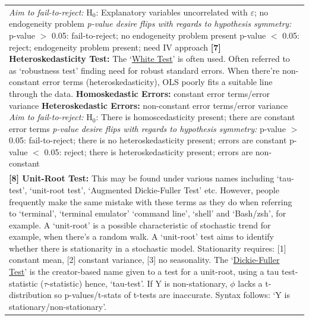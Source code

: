 \documentclass[11pt, english]{article}
\begin{document}
\begin{center}
\begin{longtable}{p{14cm}}
			\textit{Aim to fail-to-reject:}\newline
			H$_0$: Explanatory variables uncorrelated with $\varepsilon$; no endogeneity problem\newline\newline
			\textit{p-value desire flips with regards to hypothesis symmetry:}\newline
			p-value $>$ 0.05: fail-to-reject; no endogeneity problem present\newline
			p-value $<$ 0.05: reject; endogeneity problem present; need IV approach\newline\newline
			\textbf{[7] Heteroskedasticity Test: }The `\underline{White Test}' is often used. Often referred to as `robustness test' finding need for robust standard errors. When there’re non-constant error terms (heteroskedasticity), OLS poorly fits a suitable line through the data.\newline\newline
			\textbf{Homoskedastic Errors: }constant error terms/error variance\newline
			\textbf{Heteroskedastic Errors: }non-constant error terms/error variance\newline\newline
			\textit{Aim to fail-to-reject:}\newline
			H$_0$: There is homoscedasticity present; there are constant error terms\newline\newline
			\textit{p-value desire flips with regards to hypothesis symmetry:}\newline
			p-value $>$ 0.05: fail-to-reject; there is no heteroskedasticity present; errors are constant\newline
			p-value $<$ 0.05: reject; there is heteroskedasticity present; errors are non-constant\\
			\textbf{[8] Unit-Root Test: }This may be found under various names including `tau-test’, `unit-root test’, `Augmented Dickie-Fuller Test’ etc. However, people frequently make the same mistake with these terms as they do when referring to `terminal’, `terminal emulator’ `command line’, `shell’ and `Bash/zsh’, for example.\newline\newline
			A `unit-root’ is a possible characteristic of stochastic trend for example, when there’s a random walk. A `unit-root’ test aims to identify whether there is stationarity in a stochastic model. Stationarity requires: [1] constant mean, [2] constant variance, [3] no seasonality. The `\underline{Dickie-Fuller Test}' is the creator-based name given to a test for a unit-root, using a tau test-statistic ($\tau$-statistic) hence, `tau-test’. If Y is non-stationary, $\phi$ lacks a t-distribution so p-values/t-stats of t-tests are inaccurate. Syntax follows: `Y is stationary/non-stationary’.\newline\newline

\end{longtable}
\end{center}
\end{document}
